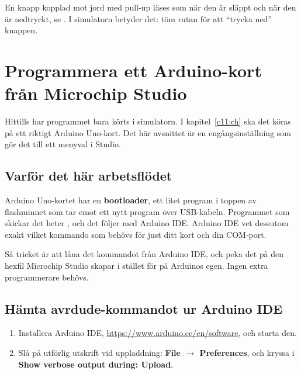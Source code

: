 En knapp kopplad mot jord med pull-up läses som  när den är släppt och  när den är
nedtryckt, se . I simulatorn betyder det: töm rutan för att \enquote{trycka ned}
knappen.

\section{Programmera ett Arduino-kort från Microchip Studio}
\label{studio:5}
Hittills har programmet bara körts i simulatorn. I kapitel~\ref{c11:ch} ska det köras på ett
riktigt Arduino Uno-kort. Det här avsnittet är en engångsinställning som gör det till ett menyval i
Studio.

\subsection{Varför det här arbetsflödet}
\label{studio:5-1}
Arduino Uno-kortet har en \textbf{bootloader}, ett litet program i toppen av flashminnet som tar
emot ett nytt program över USB-kabeln. Programmet som skickar det heter , och det
följer med Arduino IDE. Arduino IDE vet dessutom exakt vilket kommando som behövs för just ditt
kort och din COM-port.

Så tricket är att låna det kommandot från Arduino IDE, och peka det på den hexfil Microchip Studio
skapar i stället för på Arduinos egen. Ingen extra programmerare behövs.

\subsection{Hämta avrdude-kommandot ur Arduino IDE}
\label{studio:5-2}
\begin{enumerate}
  \item Installera Arduino IDE, \url{https://www.arduino.cc/en/software}, och starta den.
  \item Slå på utförlig utskrift vid uppladdning: \textbf{File $\rightarrow$ Preferences}, och
    kryssa i \textbf{Show verbose output during: Upload}.
\end{enumerate}



